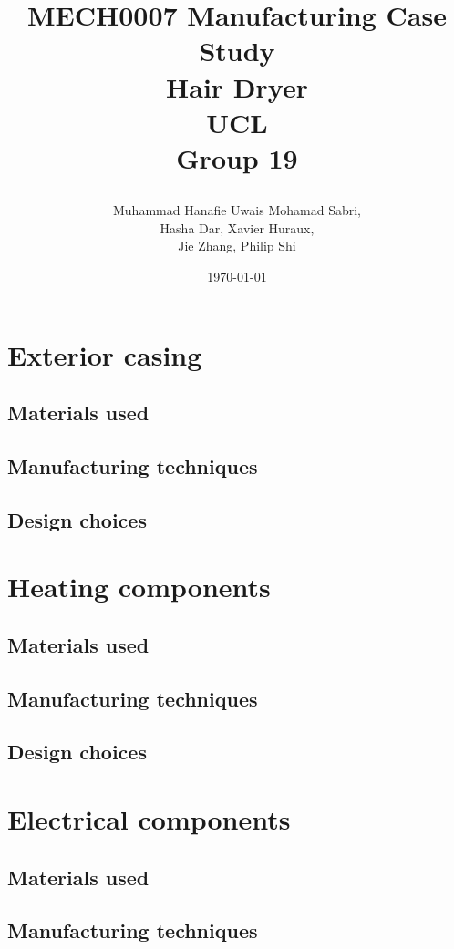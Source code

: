 \documentclass[12pt,a4paper, twoside]{report}
\begin{document}
\title{
  {MECH0007 Manufacturing Case Study}\\
  {Hair Dryer}\\
  {\large UCL}\\
  {\large Group 19}
  \author{Muhammad Hanafie Uwais Mohamad Sabri,\\Hasha Dar, Xavier Huraux,\\Jie Zhang, Philip Shi}
  \date{\today}
}
\maketitle
\tableofcontents
\chapter{Exterior casing}
\section{Materials used}
\section{Manufacturing techniques}
\section{Design choices}
\chapter{Heating components}
\section{Materials used}
\section{Manufacturing techniques}
\section{Design choices}
\chapter{Electrical components}
\section{Materials used}
\section{Manufacturing techniques}
\end{document}
